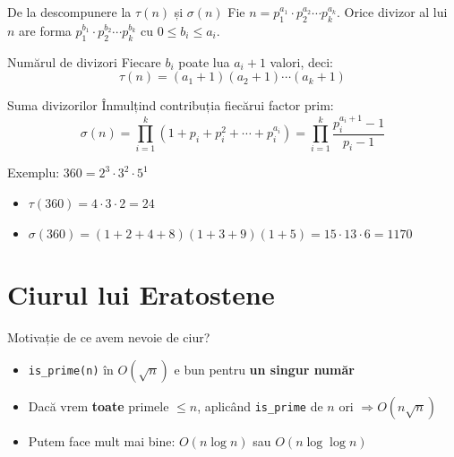 \documentclass{beamer}
\begin{document}
\begin{frame}[shrink]{De la descompunere la $\tau(n)$ și $\sigma(n)$}
  Fie $n = p_1^{a_1} \cdot p_2^{a_2} \cdots p_k^{a_k}$. Orice divizor al lui $n$ are forma
  $p_1^{b_1} \cdot p_2^{b_2} \cdots p_k^{b_k}$ cu $0 \leq b_i \leq a_i$.
  \begin{block}{Numărul de divizori}
    Fiecare $b_i$ poate lua $a_i + 1$ valori, deci:
    \[ \tau(n) = (a_1+1)(a_2+1)\cdots(a_k+1) \]
  \end{block}
  \begin{block}{Suma divizorilor}
    Înmulțind contribuția fiecărui factor prim:
    \[ \sigma(n) = \prod_{i=1}^{k}(1 + p_i + p_i^2 + \cdots + p_i^{a_i}) = \prod_{i=1}^{k}\frac{p_i^{a_i+1}-1}{p_i-1} \]
  \end{block}
  Exemplu: $360 = 2^3 \cdot 3^2 \cdot 5^1$
  \begin{itemize}
    \item $\tau(360) = 4 \cdot 3 \cdot 2 = 24$
    \item $\sigma(360) = (1{+}2{+}4{+}8)(1{+}3{+}9)(1{+}5) = 15 \cdot 13 \cdot 6 = 1170$
  \end{itemize}
\end{frame}

\section{Ciurul lui Eratostene}

\begin{frame}{Motivație \textemdash{} de ce avem nevoie de ciur?}
  \begin{itemize}
    \item \texttt{is\_prime(n)} în $O(\sqrt{n})$ e bun pentru \textbf{un singur număr}
    \item Dacă vrem \textbf{toate} primele $\leq n$, aplicând \texttt{is\_prime} de $n$ ori $\Rightarrow O(n\sqrt{n})$
    \item Putem face mult mai bine: $O(n \log n)$ sau $O(n \log \log n)$
  \end{itemize}
\end{frame}
\end{document}
